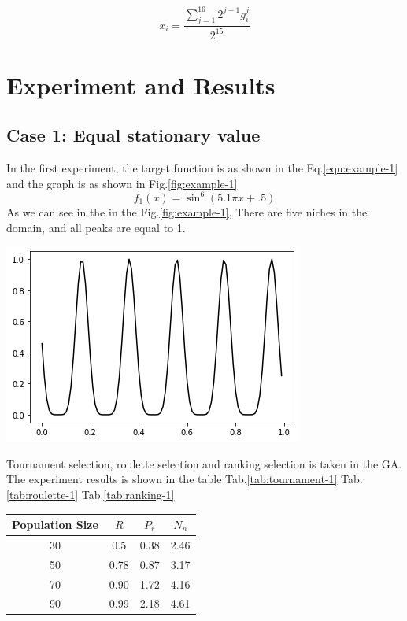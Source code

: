 \documentclass[smallextended]{svjour3}       %
\begin{document}
\begin{multicols}{2}
\begin{equation}
x_i=\frac{\sum_{j=1}^{16}2^{j-1}g_i^j}{2^{15}}
\end{equation}




\section{Experiment and Results}
\subsection{Case 1: Equal stationary value}
In the first experiment, the target function is as shown in the
Eq.\ref{equ:example-1} and the graph is as shown in Fig.\ref{fig:example-1} 
\begin{equation}
f_{1}(x)=\sin^{6}(5.1 \pi x+.5)
\label{equ:example-1}
\end{equation} \newline
As we can see in the in the Fig.\ref{fig:example-1}, There are five niches in
the domain, and all peaks are equal to 1. 
\begin{center}
  \includegraphics[width=\linewidth]{GA_images/example-sin.png}
  \label{fig:example-1}
\end{center} 
Tournament selection, roulette selection and ranking selection is taken in the
GA.
The experiment results is shown in the table 
Tab.\ref{tab:tournament-1}
Tab.\ref{tab:roulette-1}
Tab.\ref{tab:ranking-1}

\begin{center}
\begin{tabular}{cccc}
	\toprule
    Population Size      & $R$   &  $P_{r}$ & $N_{n}$\\
	\midrule
    30                   & 0.5  &  0.38   & 2.46 \\
    50                   & 0.78  &  0.87   & 3.17 \\
    70                   & 0.90  &  1.72   & 4.16 \\
    90                   & 0.99  &  2.18   & 4.61 \\
	\bottomrule
\end{tabular}
\label{tab:tournament-1}
\end{center}


\end{multicols}
\end{document}
